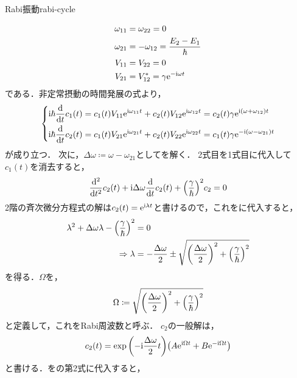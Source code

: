 \documentclass{report}
\begin{document}
\begin{myex}{Rabi振動}{rabi-cycle}
\begin{enumerate}
\begin{align}
          \omega_{11} &= \omega_{22} = 0 \\ 
          \omega_{21} &= -\omega_{12} = \frac{E_2 - E_1}{\hbar} \\ 
          V_{11} &= V_{22} = 0 \\ 
          V_{21} &= V_{12}^* = \gamma\mathrm{e}^{-\mathrm{i}\omega t}
        \end{align}
        である．非定常摂動の時間発展の式より，
        \begin{align}
          \begin{dcases}
            \mathrm{i}\hbar\dv{t}c_1(t) = c_1(t)V_{11}\mathrm{e}^{\mathrm{i}\omega_{11}t} + c_2(t)V_{12}\mathrm{e}^{\mathrm{i}\omega_{12}t} = c_2(t)\gamma\mathrm{e}^{\mathrm{i}\qty(\omega + \omega_{12}) t} \label{rabi-cnt-eq}\\ 
            \mathrm{i}\hbar\dv{t}c_2(t) = c_1(t)V_{21}\mathrm{e}^{\mathrm{i}\omega_{21}t} + c_2(t)V_{22}\mathrm{e}^{\mathrm{i}\omega_{22}t} = c_1(t)\gamma\mathrm{e}^{-\mathrm{i}\qty(\omega - \omega_{21}) t} 
          \end{dcases}
        \end{align}
        が成り立つ．
        次に，$\Delta\omega \coloneqq \omega - \omega_{21}$としてを解く．
        2式目を1式目に代入して$c_1(t)$を消去すると，
        \begin{align}
          \dv[2]{t}c_2(t) + \mathrm{i}\Delta\omega\dv{t}c_2(t) + \qty(\frac{\gamma}{\hbar})^2c_2 = 0\label{rabi-cnt-eq-c2}
        \end{align}
        2階の斉次微分方程式の解は$c_2(t) = \mathrm{e}^{\mathrm{i}\lambda t}$と書けるので，これをに代入すると，
        \begin{align}
          \lambda^2 + \Delta\omega\lambda - \qty(\frac{\gamma}{\hbar})^2 &= 0 \\
          \Rightarrow \lambda &= -\frac{\Delta\omega}{2}\pm\sqrt{\qty(\frac{\Delta\omega}{2})^2 + \qty(\frac{\gamma}{\hbar})^2}
        \end{align} 
        を得る．$\Omega$を，
        \begin{align}
          \Omega \coloneqq \sqrt{\qty(\frac{\Delta\omega}{2})^2 + \qty(\frac{\gamma}{\hbar})^2}\label{rabi-freq}
        \end{align}
        と定義して，これをRabi周波数と呼ぶ．
        $c_2$の一般解は，
        \begin{align}
          c_2(t) = \exp\qty(-\mathrm{i}\frac{\Delta\omega}{2}t)\qty(A\mathrm{e}^{\mathrm{i}\Omega t} + B\mathrm{e}^{-\mathrm{i}\Omega t})\label{c2t-general-solution}
        \end{align}
        と書ける．をの第2式に代入すると，

\end{enumerate}
\end{myex}
\end{document}
